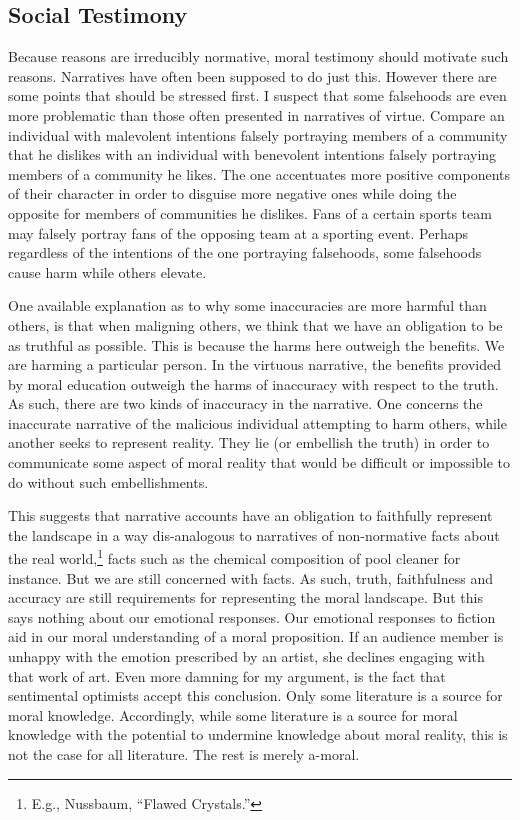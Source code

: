 \documentclass[
  12pt,
]{book}
\theoremstyle{definition}
\theoremstyle{definition}
\theoremstyle{definition}
\theoremstyle{definition}
\theoremstyle{remark}
\begin{document}
\subsection*{Social Testimony}\label{social-testimony}

Because reasons are irreducibly normative, moral testimony should motivate such reasons. Narratives have often been supposed to do just this. However there are some points that should be stressed first. I suspect that some falsehoods are even more problematic than those often presented in narratives of virtue. Compare an individual with malevolent intentions falsely portraying members of a community that he dislikes with an individual with benevolent intentions falsely portraying members of a community he likes. The one accentuates more positive components of their character in order to disguise more negative ones while doing the opposite for members of communities he dislikes. Fans of a certain sports team may falsely portray fans of the opposing team at a sporting event. Perhaps regardless of the intentions of the one portraying falsehoods, some falsehoods cause harm while others elevate.

One available explanation as to why some inaccuracies are more harmful than others, is that when maligning others, we think that we have an obligation to be as truthful as possible. This is because the harms here outweigh the benefits. We are harming a particular person. In the virtuous narrative, the benefits provided by moral education outweigh the harms of inaccuracy with respect to the truth. As such, there are two kinds of inaccuracy in the narrative. One concerns the inaccurate narrative of the malicious individual attempting to harm others, while another seeks to represent reality. They lie (or embellish the truth) in order to communicate some aspect of moral reality that would be difficult or impossible to do without such embellishments.

This suggests that narrative accounts have an obligation to faithfully represent the landscape in a way dis-analogous to narratives of non-normative facts about the real world,\footnote{E.g., Nussbaum, {``Flawed {Crystals}.''}} facts such as the chemical composition of pool cleaner for instance. But we are still concerned with facts. As such, truth, faithfulness and accuracy are still requirements for representing the moral landscape. But this says nothing about our emotional responses. Our emotional responses to fiction aid in our moral understanding of a moral proposition. If an audience member is unhappy with the emotion prescribed by an artist, she declines engaging with that work of art. Even more damning for my argument, is the fact that sentimental optimists accept this conclusion. Only some literature is a source for moral knowledge. Accordingly, while some literature is a source for moral knowledge with the potential to undermine knowledge about moral reality, this is not the case for all literature. The rest is merely a-moral.
\end{document}
